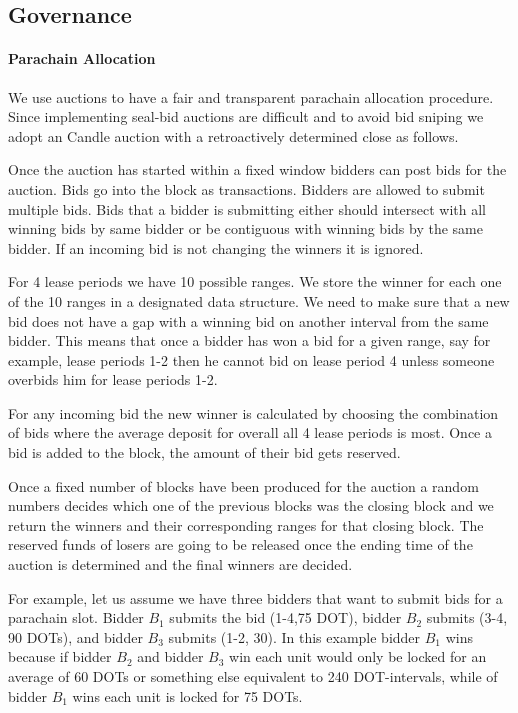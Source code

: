 \subsection{Governance}\label{sec:governance}
 \paragraph{Parachain Allocation}
We use auctions to have a fair and transparent parachain allocation procedure.
Since implementing seal-bid auctions are difficult and to avoid bid sniping we adopt an Candle auction \cite{Fuellbrunn:2012:CandleAuction} with a retroactively determined close as follows.

Once the auction has started within a fixed window bidders can post bids for the auction.
Bids go into the block as transactions.
Bidders are allowed to submit multiple bids.
Bids that a bidder is submitting either should intersect with all winning bids by same bidder or be contiguous with winning bids by the same bidder.
If an incoming bid is not changing the winners it is ignored.

For 4 lease periods we have 10 possible ranges.
We store the winner for each one of the 10 ranges in a designated data structure.
We need to make sure that a new bid does not have a gap with a winning bid on another interval from the same bidder.
This means that once a bidder has won a bid for a given range, say for example, lease periods 1-2 then he cannot bid on lease period 4 unless someone overbids him for lease periods 1-2.

For any incoming bid the new winner is calculated by choosing the combination of bids where the average deposit for overall all 4 lease periods is most.
Once a bid is added to the block, the amount of their bid gets reserved.

Once a fixed number of blocks have been produced for the auction a random numbers decides which one of the previous blocks was the closing block and we return the winners and their corresponding ranges for that closing block.
The reserved funds of losers are going to be released once the ending time of the auction is determined and the final winners are decided.

For example, let us assume we have three bidders that want to submit bids for a parachain slot.
Bidder $B_1$ submits the bid (1-4,75 DOT), bidder $B_2$ submits (3-4, 90 DOTs), and bidder $B_3$ submits (1-2, 30).
In this example bidder $B_1$ wins because if bidder $B_2$ and bidder $B_3$ win each unit would only be locked for an average of 60 DOTs or something else equivalent to 240 DOT-intervals, while of bidder $B_1$ wins each unit is locked for 75 DOTs.

